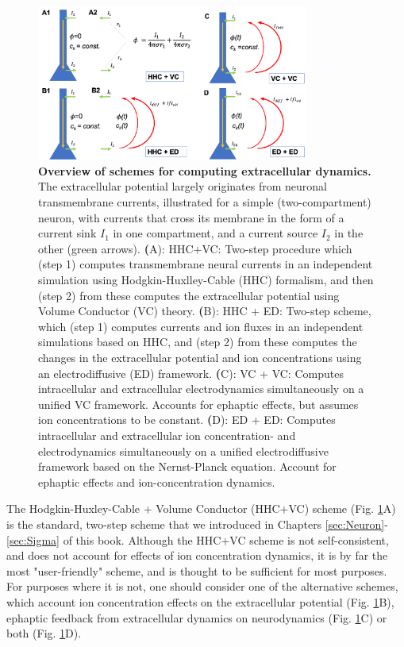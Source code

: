 \begin{figure}[!ht]
\begin{center}
\includegraphics[width=0.8\textwidth]{Figures/Schemes/Schemes.png}
\end{center}
\caption{\textbf{Overview of schemes for computing extracellular dynamics.} The extracellular potential largely originates from neuronal transmembrane currents, illustrated for a simple (two-compartment) neuron, with currents that cross its membrane in the form of a current sink $I_1$ in one compartment, and a current source $I_2$ in the other (green arrows). {\textbf (A)}: HHC+VC: Two-step procedure which (step 1) computes transmembrane neural currents in an independent simulation using Hodgkin-Huxlley-Cable (HHC) formalism, and then (step 2) from these computes the extracellular potential using Volume Conductor (VC) theory. {\textbf (B)}: HHC + ED: Two-step scheme, which (step 1) computes currents and ion fluxes in an independent simulations based on HHC, and (step 2) from these computes the changes in the extracellular potential and ion concentrations using an electrodiffusive (ED) framework. {\textbf (C)}: VC + VC: Computes intracellular and extracellular electrodynamics simultaneously on a unified VC framework. Accounts for ephaptic effects, but assumes ion concentrations to be constant. {\textbf (D)}: ED + ED: Computes intracellular and extracellular ion concentration- and electrodynamics simultaneously on a unified electrodiffusive framework based on the Nernst-Planck equation. Account for ephaptic effects and ion-concentration dynamics. 
}
\label{Schemes:fig:schemes}
\end{figure}

The Hodgkin-Huxley-Cable + Volume Conductor (HHC+VC) scheme (Fig. \ref{Schemes:fig:schemes}A) is the standard, two-step scheme that we introduced in Chapters \ref{sec:Neuron}-\ref{sec:Sigma} of this book. Although the HHC+VC scheme is not self-consistent, and does not account for effects of ion concentration dynamics, it is by far the most "user-friendly" scheme, and is thought to be sufficient for most purposes. For purposes where it is not, one should consider one of the alternative schemes, which account ion concentration effects on the extracellular potential (Fig. \ref{Schemes:fig:schemes}B), ephaptic feedback from extracellular dynamics on neurodynamics (Fig. \ref{Schemes:fig:schemes}C) or both (Fig. \ref{Schemes:fig:schemes}D).

